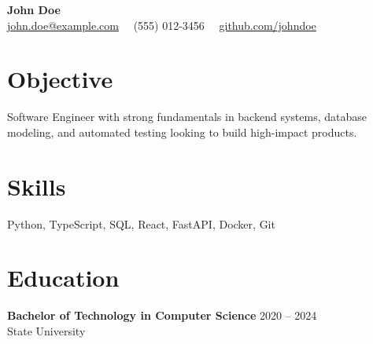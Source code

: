 \documentclass[11pt,a4paper]{article}
\begin{document}
\begin{center}
    {\LARGE \textbf{John Doe}} \\ \vspace{4pt}
    \href{mailto:john.doe@example.com}{john.doe@example.com} \ \textbullet\ (555) 012-3456 \ \textbullet\ \href{https://github.com/johndoe}{github.com/johndoe}
\end{center}

\section*{Objective}
Software Engineer with strong fundamentals in backend systems, database modeling, and automated testing looking to build high-impact products.

\section*{Skills}
Python, TypeScript, SQL, React, FastAPI, Docker, Git

\section*{Education}
\textbf{Bachelor of Technology in Computer Science} \hfill 2020 -- 2024 \\
State University
\end{document}
